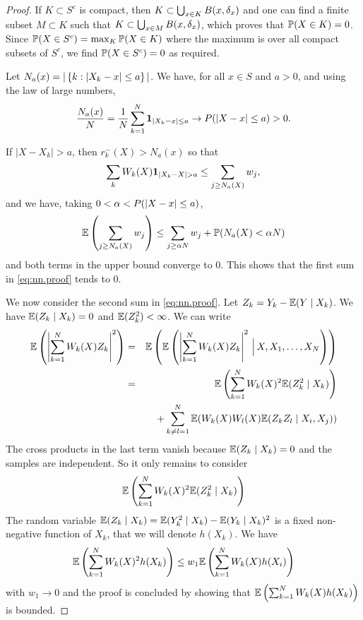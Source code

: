\begin{proof}
{If $K \subset S^c$ is compact, then  $K \subset \bigcup_{x\in K}  B(x, \delta_x)$ and one can find a finite subset $M\subset K$ such that $K \subset \bigcup_{x\in M}  B(x, \delta_x)$, which proves that $\bm{\mathbb P}(X\in K) = 0$. Since $\bm{\mathbb P}(X\in S^c) = \max_K \bm{\mathbb P}(X\in K)$ where the maximum is over all compact subsets of $S^c$, we find $\bm{\mathbb P}(X\in S^c) = 0$ as required.
}

Let $N_a(x) = |\left\{ k: |X_k - x|\leq a \right\} |$. We have, for all $x\in S$ and $a>0$,
and using the law of large numbers,
$$
\frac{N_a(x)}{N} = \frac{1}{N} \sum_{k=1}^N
{\bm 1}_{|X_k-x|\leq a} \to P(|X-x| \leq a) > 0.
$$

If $|X-X_k| > a$, then $r^-_k(X) > N_a(x)$ so that 
\[
\sum_k W_{k}(X)  \bfone_{|X_k-X|> a} \leq \sum_{j\geq N_a(X)} w_j,
\]
and we have, taking $0 < \alpha < P(|X-x| \leq a)$,  
\[
\bm{\mathbb E}\left(\sum_{j\geq N_a(X)} w_j\right)\leq
\sum_{j\geq \alpha N} w_j + \bm{\mathbb P}(N_a(X) < \alpha N)
\]
and both terms in the upper bound converge to 0. This shows that the first sum in \eqref{eq:nn.proof} tends to 0.
\bigskip
%

We now consider the second sum in \eqref{eq:nn.proof}. Let $Z_k = Y_k - \bm{\mathbb E}(Y\mid X_k)$. We have
$\bm{\mathbb E}(Z_k\mid X_k) = 0$ and $\bm{\mathbb E}(Z_k^2) <\infty$. We can write
\begin{eqnarray*}
\bm{\mathbb E}\left(\left|\sum_{k=1}^N W_{k}(X) Z_k\right|^2\right)  &=&\bm{\mathbb E}\left(\bm{\mathbb E}\left(\left|\sum_{k=1}^N W_{k}(X)
Z_k\right|^2\, \Big|\,X,X_1, \ldots, X_N\right)\right)\\
&=& \bm{\mathbb E}\left(\sum_{k=1}^N W_{k}(X)^2 \bm{\mathbb E}(Z_k^2 \mid X_k)\right) \\
&&+ \sum_{k\neq l=1}^N \bm{\mathbb E}(W_{k}(X)
W_{l}(X) \bm{\mathbb E}(Z_kZ_l \mid X_i, X_j))
\end{eqnarray*}
The cross products in the last term vanish because $\bm{\mathbb E}(Z_k\mid X_k) = 0$ and the samples are
independent. So it only remains to consider
$$
\bm{\mathbb E}\left(\sum_{k=1}^N W_{k}(X)^2 \bm{\mathbb E}( Z_k^2 \mid X_k)\right)
$$
The random variable $\bm{\mathbb E}(Z_k\mid X_k) = \bm{\mathbb E}(Y_k^2\mid X_k) - \bm{\mathbb E}(Y_k\mid X_k)^2$ is a fixed non-negative
function of $X_k$, that we will denote $h(X_k)$. 
We have
$$
\bm{\mathbb E}\left(\sum_{k=1}^N W_{k}(X)^2 h(X_k)\right)\leq w_1
\bm{\mathbb E}\left(\sum_{k=1}^N W_{k}(X) h(X_i)\right)
$$
with $w_1\to 0$ and the proof is concluded by showing that $\bm{\mathbb E}\left(\sum_{k=1}^N W_{k}(X) h(X_k)\right)$ is bounded. 


\end{proof}
